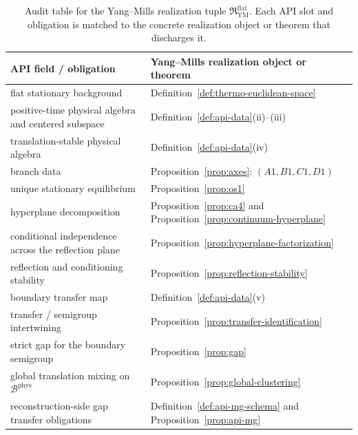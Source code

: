 \documentclass[11pt]{article}
\theoremstyle{definition}
\theoremstyle{remark}
\newcommand{\mcB}{\mathcal B}
\begin{document}
\begin{table}[ht]
\centering
\renewcommand{\arraystretch}{1.15}
\begin{tabular}{@{}p{4.2cm}p{8.2cm}@{}}
\hline
API field / obligation & Yang--Mills realization object or theorem \\
\hline
flat stationary background &
Definition~\ref{def:thermo-euclidean-space} \\
positive-time physical algebra and centered subspace &
Definition~\ref{def:api-data}\textnormal{(ii)--(iii)} \\
translation-stable physical algebra &
Definition~\ref{def:api-data}\textnormal{(iv)} \\
branch data &
Proposition~\ref{prop:axes}: \((A1,B1,C1,D1)\) \\
unique stationary equilibrium &
Proposition~\ref{prop:os1} \\
hyperplane decomposition &
Proposition~\ref{prop:ca4} and
Proposition~\ref{prop:continuum-hyperplane} \\
conditional independence across the reflection plane &
Proposition~\ref{prop:hyperplane-factorization} \\
reflection and conditioning stability &
Proposition~\ref{prop:reflection-stability} \\
boundary transfer map &
Definition~\ref{def:api-data}\textnormal{(v)} \\
transfer / semigroup intertwining &
Proposition~\ref{prop:transfer-identification} \\
strict gap for the boundary semigroup &
Proposition~\ref{prop:gap} \\
global translation mixing on \(\mcB^{\mathrm{phys}}\) &
Proposition~\ref{prop:global-clustering} \\
reconstruction-side gap transfer obligations &
Definition~\ref{def:api-mg-schema} and
Proposition~\ref{prop:api-mg} \\
\hline
\end{tabular}
\caption{Audit table for the Yang--Mills realization tuple
\(\mathfrak R_{\mathrm{YM}}^{\mathrm{flat}}\).  Each API slot and obligation is
matched to the concrete realization object or theorem that discharges it.}
\label{tab:api-implementation-audit}
\end{table}
\end{document}
